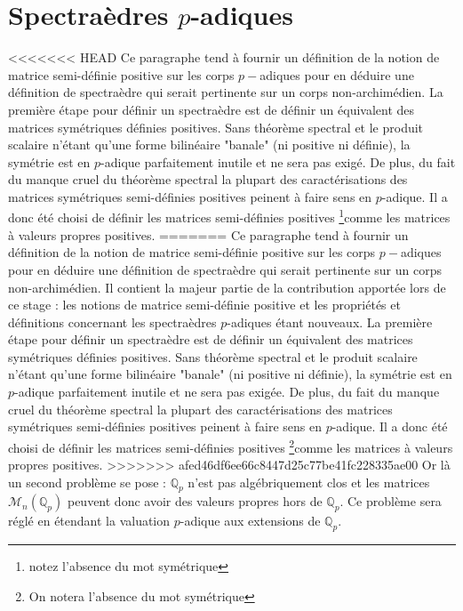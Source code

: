\newcommand\mat{matrice semi-définie positive } 
\newcommand\Mat{Matrice semi-définie positive }
\newcommand\mats{matrices semi-définies positives }
\newcommand\Mats{Matrices semi-définies positives }


\section{Spectraèdres \texorpdfstring{$p$}{p}-adiques } 
\label{sec:spectraedre} 
<<<<<<< HEAD
Ce paragraphe tend à fournir un définition de la notion de \mat sur les corps $p-$adiques pour en déduire une définition de spectraèdre qui serait pertinente sur un corps non-archimédien. 
La première étape pour définir un spectraèdre est de définir un équivalent des matrices symétriques définies positives. Sans théorème spectral et le produit scalaire n'étant qu'une forme bilinéaire "banale" (ni positive ni définie), la symétrie est en $p$-adique parfaitement inutile et ne sera pas exigé. De plus, du fait du manque cruel du théorème spectral la plupart des caractérisations des matrices symétriques semi-définies positives peinent à faire sens en $p$-adique. 
Il a donc été choisi de définir les \mats \footnote{notez l'absence du mot symétrique}comme les matrices à valeurs propres positives.
=======
Ce paragraphe tend à fournir un définition de la notion de \mat sur les corps $p-$adiques pour en déduire une définition de spectraèdre qui serait pertinente sur un corps non-archimédien. Il contient la majeur partie de la contribution apportée lors de ce stage : les notions de matrice semi-définie positive et les propriétés et définitions concernant les spectraèdres $p$-adiques étant nouveaux. 
La première étape pour définir un spectraèdre est de définir un équivalent des matrices symétriques définies positives. Sans théorème spectral et le produit scalaire n'étant qu'une forme bilinéaire "banale" (ni positive ni définie), la symétrie est en $p$-adique parfaitement inutile et ne sera pas exigée. De plus, du fait du manque cruel du théorème spectral la plupart des caractérisations des matrices symétriques semi-définies positives peinent à faire sens en $p$-adique. 
Il a donc été choisi de définir les \mats \footnote{On notera l'absence du mot symétrique}comme les matrices à valeurs propres positives.
>>>>>>> afed46df6ee66c8447d25c77be41fc228335ae00
Or là un second problème se pose : $\mathbb{Q}_{p} $ n'est pas algébriquement clos et les matrices $\mathcal{M}_n\left( \mathbb{Q}_{p}  \right) $ peuvent donc avoir des valeurs propres hors de $\mathbb{Q}_{p}$. Ce problème sera réglé en étendant la valuation $p$-adique aux extensions de $\mathbb{Q}_{p} $.

